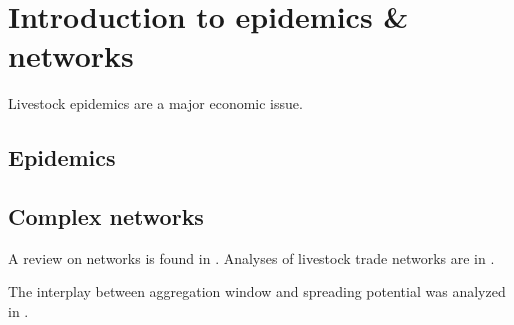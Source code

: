 
\chapter{Introduction to epidemics \& networks}
Livestock epidemics are a major economic issue.

\section{Epidemics}




\section{Complex networks}
A review on networks is found in \citet{Newman2003}.
Analyses of livestock trade networks are in \citet{Christley:2005}
\citet{Bigras:2007}\citet{Green:2006}.

The interplay between aggregation window and spreading potential was analyzed in \citet{Bajardi:2012}.


